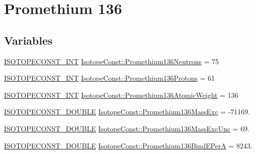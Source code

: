 \hypertarget{group___isotope_const-_promethium-_pm136}{}\section{Promethium 136}
\label{group___isotope_const-_promethium-_pm136}
\subsection*{Variables}
\begin{DoxyCompactItemize}
\item 
\mbox{\hyperlink{group___isotope_const-_macros_ga5f18360b3e99483a35c32d789e62621c}{I\+S\+O\+T\+O\+P\+E\+C\+O\+N\+S\+T\+\_\+\+I\+NT}} \mbox{\hyperlink{group___isotope_const-_promethium-_pm136_gac0460554a4764e47f7e2ebbe706a909c}{Isotope\+Const\+::\+Promethium136\+Neutrons}} = 75
\item 
\mbox{\hyperlink{group___isotope_const-_macros_ga5f18360b3e99483a35c32d789e62621c}{I\+S\+O\+T\+O\+P\+E\+C\+O\+N\+S\+T\+\_\+\+I\+NT}} \mbox{\hyperlink{group___isotope_const-_promethium-_pm136_gad60062e68c18e7c9e318cfd87d1371cb}{Isotope\+Const\+::\+Promethium136\+Protons}} = 61
\item 
\mbox{\hyperlink{group___isotope_const-_macros_ga5f18360b3e99483a35c32d789e62621c}{I\+S\+O\+T\+O\+P\+E\+C\+O\+N\+S\+T\+\_\+\+I\+NT}} \mbox{\hyperlink{group___isotope_const-_promethium-_pm136_ga7025aaa25e17603bf6fafdcc4e6ea458}{Isotope\+Const\+::\+Promethium136\+Atomic\+Weight}} = 136
\item 
\mbox{\hyperlink{group___isotope_const-_macros_ga8f45a7272ce02c0b4c65c44636ed719a}{I\+S\+O\+T\+O\+P\+E\+C\+O\+N\+S\+T\+\_\+\+D\+O\+U\+B\+LE}} \mbox{\hyperlink{group___isotope_const-_promethium-_pm136_gaeffda8e02d0417a9f1d66ec2598c80e7}{Isotope\+Const\+::\+Promethium136\+Mass\+Exc}} = -\/71169.
\item 
\mbox{\hyperlink{group___isotope_const-_macros_ga8f45a7272ce02c0b4c65c44636ed719a}{I\+S\+O\+T\+O\+P\+E\+C\+O\+N\+S\+T\+\_\+\+D\+O\+U\+B\+LE}} \mbox{\hyperlink{group___isotope_const-_promethium-_pm136_ga85e73a0f236df5a940bb2681c48d6959}{Isotope\+Const\+::\+Promethium136\+Mass\+Exc\+Unc}} = 69.
\item 
\mbox{\hyperlink{group___isotope_const-_macros_ga8f45a7272ce02c0b4c65c44636ed719a}{I\+S\+O\+T\+O\+P\+E\+C\+O\+N\+S\+T\+\_\+\+D\+O\+U\+B\+LE}} \mbox{\hyperlink{group___isotope_const-_promethium-_pm136_ga43c4efc0d28287b5f6b6ce3211077e5d}{Isotope\+Const\+::\+Promethium136\+Bind\+E\+PerA}} = 8243.

\end{DoxyCompactItemize}
